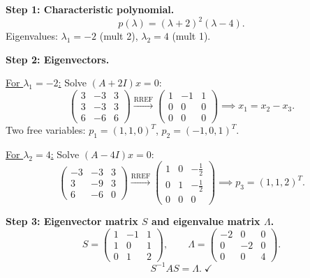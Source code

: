 \documentclass[12pt,a3paper]{article}
\begin{document}
\begin{tcolorbox}[enhanced,breakable,
  colback=cE!4,colframe=cE,boxrule=0.8pt,arc=5pt,
  title={\textbf{Answer --- Eigenvalues, Eigenvectors, $S$ and $\Lambda$}},
  fonttitle=\bfseries\color{white},colbacktitle=cE]

\textbf{Step 1: Characteristic polynomial.}
\[
p(\lambda)=(\lambda+2)^2(\lambda-4).
\]
Eigenvalues: $\lambda_1=-2$ (mult 2), $\lambda_2=4$ (mult 1).

\medskip
\textbf{Step 2: Eigenvectors.}

\underline{For $\lambda_1=-2$:} Solve $(A+2I)x=0$:
\[
\begin{pmatrix}3&-3&3\\3&-3&3\\6&-6&6\end{pmatrix}\xrightarrow{\text{RREF}}\begin{pmatrix}1&-1&1\\0&0&0\\0&0&0\end{pmatrix}\implies x_1=x_2-x_3.
\]
Two free variables: $p_1=(1,1,0)^T$, $p_2=(-1,0,1)^T$.

\underline{For $\lambda_2=4$:} Solve $(A-4I)x=0$:
\[
\begin{pmatrix}-3&-3&3\\3&-9&3\\6&-6&0\end{pmatrix}\xrightarrow{\text{RREF}}\begin{pmatrix}1&0&-\frac{1}{2}\\0&1&-\frac{1}{2}\\0&0&0\end{pmatrix}\implies p_3=(1,1,2)^T.
\]

\textbf{Step 3: Eigenvector matrix $S$ and eigenvalue matrix $\Lambda$.}
\[
S=\begin{pmatrix}1&-1&1\\1&0&1\\0&1&2\end{pmatrix},\qquad
\Lambda=\begin{pmatrix}-2&0&0\\0&-2&0\\0&0&4\end{pmatrix}.
\]
\[
S^{-1}AS=\Lambda.\;\checkmark
\]

\end{tcolorbox}
\end{document}
